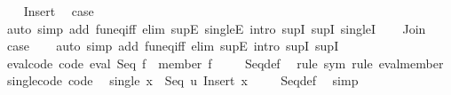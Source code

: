 \begin{isabellebody}
\isanewline
\ \ \isamarkupfalse%
\ Insert\ \isamarkupfalse%
\ {\isacharquery}{\kern0pt}case\isanewline
\ \ \isamarkupfalse%
\ {\isacharparenleft}{\kern0pt}auto\ simp\ add{\isacharcolon}{\kern0pt}\ fun{\isacharunderscore}{\kern0pt}eq{\isacharunderscore}{\kern0pt}iff\ elim{\isacharcolon}{\kern0pt}\ supE\ singleE\ intro{\isacharcolon}{\kern0pt}\ supI{}\ supI{}\ singleI{\isacharparenright}{\kern0pt}\isanewline
{}\isamarkupfalse%
\isanewline
\ \ \isamarkupfalse%
\ Join\ \isamarkupfalse%
\ \isamarkupfalse%
\ {\isacharquery}{\kern0pt}case\isanewline
\ \ \isamarkupfalse%
\ {\isacharparenleft}{\kern0pt}auto\ simp\ add{\isacharcolon}{\kern0pt}\ fun{\isacharunderscore}{\kern0pt}eq{\isacharunderscore}{\kern0pt}iff\ elim{\isacharcolon}{\kern0pt}\ supE\ intro{\isacharcolon}{\kern0pt}\ supI{}\ supI{}{\isacharparenright}{\kern0pt}\isanewline
{}\isamarkupfalse%
%
\endisatagproof
{\isafoldproof}%
%
\isadelimproof
\isanewline
%
\endisadelimproof
\isanewline
{}\isamarkupfalse%
\ eval{\isacharunderscore}{\kern0pt}code\ {\isacharbrackleft}{\kern0pt}code{\isacharbrackright}{\kern0pt}{\isacharcolon}{\kern0pt}\ {\isachardoublequoteopen}eval\ {\isacharparenleft}{\kern0pt}Seq\ f{\isacharparenright}{\kern0pt}\ {\isacharequal}{\kern0pt}\ member\ {\isacharparenleft}{\kern0pt}f\ {\isacharparenleft}{\kern0pt}{\isacharparenright}{\kern0pt}{\isacharparenright}{\kern0pt}{\isachardoublequoteclose}\isanewline
%
\isadelimproof
\ \ %
\endisadelimproof
%
\isatagproof
{}\isamarkupfalse%
\ Seq{\isacharunderscore}{\kern0pt}def\ \isamarkupfalse%
\ {\isacharparenleft}{\kern0pt}rule\ sym{\isacharcomma}{\kern0pt}\ rule\ eval{\isacharunderscore}{\kern0pt}member{\isacharparenright}{\kern0pt}%
\endisatagproof
{\isafoldproof}%
%
\isadelimproof
\isanewline
%
\endisadelimproof
\isanewline
{}\isamarkupfalse%
\ single{\isacharunderscore}{\kern0pt}code\ {\isacharbrackleft}{\kern0pt}code{\isacharbrackright}{\kern0pt}{\isacharcolon}{\kern0pt}\isanewline
\ \ {\isachardoublequoteopen}single\ x\ {\isacharequal}{\kern0pt}\ Seq\ {\isacharparenleft}{\kern0pt}{\isasymlambda}u{\isachardot}{\kern0pt}\ Insert\ x\ {\isasymbottom}{\isacharparenright}{\kern0pt}{\isachardoublequoteclose}\isanewline
%
\isadelimproof
\ \ %
\endisadelimproof
%
\isatagproof
{}\isamarkupfalse%
\ Seq{\isacharunderscore}{\kern0pt}def\ \isamarkupfalse%
\ simp%

\end{isabellebody}
